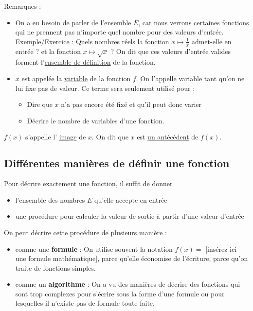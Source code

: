 \documentclass[10pt,a4paper]{book}
\begin{document}
Remarques :
\begin{itemize}
    \item On a eu besoin de parler de l'ensemble $E$, car nous verrons certaines fonctions qui ne prennent pas n'importe quel nombre pour des valeurs d'entrée. 
    Exemple/Exercice : Quels nombres réels la fonction $x \mapsto \frac{1}{x}$ admet-elle en entrée ? et la fonction $x \mapsto \sqrt{x}$ ? 
    On dit que ces valeurs d'entrée valides forment l'\underline{ensemble de définition} de la fonction.
    \item $x$ est appelée la \underline{variable} de la fonction $f$. On l'appelle variable tant qu'on ne lui fixe pas de valeur. Ce terme sera seulement utilisé pour : 
    \begin{itemize}
        \item Dire que $x$ n'a pas encore été fixé et qu'il peut donc varier
        \item Décrire le nombre de variables d'une fonction.
    \end{itemize}
\end{itemize}

\begin{de}
    $f(x)$ s'appelle l' \underline{image} de $x$. On dit que $x$ est \underline{un antécédent} de $f(x)$.
\end{de}

\subsection{Différentes manières de définir une fonction}

Pour décrire exactement une fonction, il suffit de donner \begin{itemize}
    \item l'ensemble des nombres $E$ qu'elle accepte en entrée
    \item une procédure pour calculer la valeur de sortie à partir d'une valeur d'entrée
\end{itemize}

On peut décrire cette procédure de plusieurs manière :
\begin{itemize}
    \item comme une \textbf{formule} : On utilise souvent la notation $f(x) = $ [insérez ici une formule mathématique], parce qu'elle économise de l'écriture, parce qu'on traite de fonctions simples. 
    \item comme un \textbf{algorithme} : On a vu des manières de décrire des fonctions qui sont trop complexes pour s'écrire sous la forme d'une formule ou pour lesquelles il n'existe pas de formule toute faite. 
\end{itemize}
\end{document}

